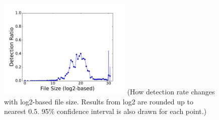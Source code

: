 \begin{figure}[t!]
\begin{center}
\includegraphics[width=2.5in]{figure/size}
{\footnotesize{(How detection rate changes with log2-based file size.
Results from log2 are rounded up to nearest 0.5.
95\% confidence interval is also drawn for each point.)}}
\end{center}
\end{figure}